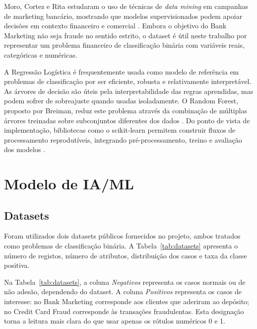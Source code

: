 \documentclass[10pt,twocolumn]{article}
\begin{document}
Moro, Cortez e Rita estudaram o uso de técnicas de \textit{data mining} em campanhas de marketing bancário, mostrando que modelos supervisionados podem apoiar decisões em contexto financeiro e comercial \cite{moro2014data}. Embora o objetivo do Bank Marketing não seja fraude no sentido estrito, o dataset é útil neste trabalho por representar um problema financeiro de classificação binária com variáveis reais, categóricas e numéricas.

A Regressão Logística é frequentemente usada como modelo de referência em problemas de classificação por ser eficiente, robusta e relativamente interpretável. As árvores de decisão são úteis pela interpretabilidade das regras aprendidas, mas podem sofrer de sobreajuste quando usadas isoladamente. O Random Forest, proposto por Breiman, reduz este problema através da combinação de múltiplas árvores treinadas sobre subconjuntos diferentes dos dados \cite{breiman2001random}. Do ponto de vista de implementação, bibliotecas como o scikit-learn permitem construir fluxos de processamento reprodutíveis, integrando pré-processamento, treino e avaliação dos modelos \cite{pedregosa2011scikit}.

\section{Modelo de IA/ML}
\subsection{Datasets}
Foram utilizados dois datasets públicos fornecidos no projeto, ambos tratados como problemas de classificação binária. A Tabela~\ref{tab:datasets} apresenta o número de registos, número de atributos, distribuição dos casos e taxa da classe positiva.

\begin{table}[H]
\centering
\caption{Resumo dos datasets utilizados.}
\label{tab:datasets}
\end{table}

Na Tabela~\ref{tab:datasets}, a coluna \textit{Negativos} representa os casos normais ou de não adesão, dependendo do dataset. A coluna \textit{Positivos} representa os casos de interesse: no Bank Marketing corresponde aos clientes que aderiram ao depósito; no Credit Card Fraud corresponde às transações fraudulentas. Esta designação torna a leitura mais clara do que usar apenas os rótulos numéricos 0 e 1.
\end{document}
